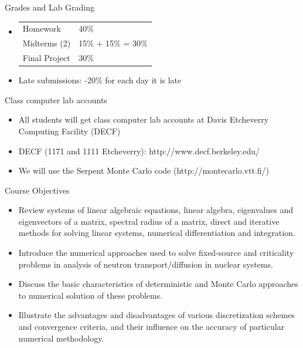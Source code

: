 \documentclass[xcolor=x11names,compress]{beamer}
\renewcommand{\(}{\begin{columns}}
\renewcommand{\)}{\end{columns}}
\newcommand{\<}[1]{\begin{column}{#1}}
\renewcommand{\>}{\end{column}}
\begin{document}
\begin{frame}{Grades and Lab}
Grading
\begin{itemize}
\item \begin{tabular}{ll}
Homework & 40\% \\
Midterms (2) & 15\% + 15\% = 30\% \\
Final Project & 30\% 
\end{tabular}
\item Late submissions: -20\% for each day it is late
\end{itemize}
Class computer lab accounts
\begin{itemize}
\item All students will get class computer lab accounts at Davis Etcheverry Computing Facility (DECF)
\item DECF (1171 and 1111 Etcheverry): http://www.decf.berkeley.edu/
\item We will use the Serpent Monte Carlo code (http://montecarlo.vtt.fi/)
\end{itemize}
\end{frame}

\begin{frame}{Course Objectives}
\begin{itemize}
\item Review systems of linear algebraic equations, linear algebra, eigenvalues and eigenvectors of a matrix, spectral radius of a matrix, direct and iterative methods for solving linear systems, numerical differentiation and integration.
\item Introduce the numerical approaches used to solve fixed-source and criticality problems in analysis of neutron transport/diffusion in nuclear systems.
\item Discuss the basic characteristics of deterministic and Monte Carlo approaches to numerical solution of these problems.
\item Illustrate the advantages and disadvantages of various discretization schemes and convergence criteria, and their influence on the accuracy of particular numerical methodology.
\end{itemize}
\end{frame}
\end{document}
